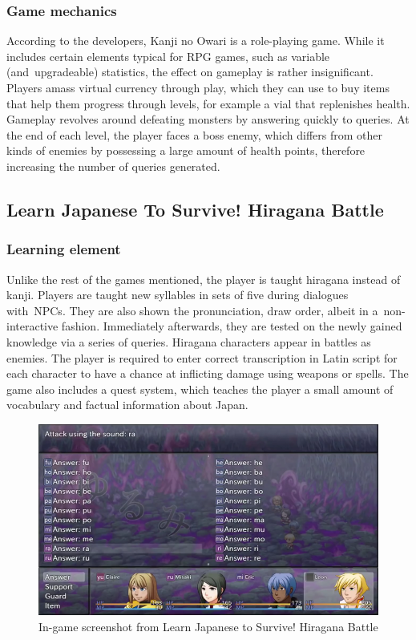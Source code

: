 \documentclass[thesis=B,english,hidelinks]{FITthesisXE}[2012/06/26]
\begin{document}
\subsubsection{Game mechanics}

According to the developers, Kanji no Owari is a role-playing game. While it includes certain elements typical for RPG games, such as variable (and~upgradeable) statistics, the effect on gameplay is rather insignificant. Players amass virtual currency through play, which they can use to buy items that help them progress through levels, for example a vial that replenishes health. Gameplay revolves around defeating monsters by answering quickly to queries. At the end of each level, the player faces a boss enemy, which differs from other kinds of enemies by possessing a large amount of health points, therefore increasing the number of queries generated.

\subsection{Learn Japanese To Survive! Hiragana Battle}

\subsubsection{Learning element}

Unlike the rest of the games mentioned, the player is taught hiragana instead of kanji. Players are taught new syllables in sets of five during dialogues with~NPCs. They are also shown the pronunciation, draw order, albeit in a~non-interactive fashion. Immediately afterwards, they are tested on the newly gained knowledge via a series of queries. Hiragana characters appear in battles as enemies. The player is required to enter correct transcription in Latin script for each character to have a chance at inflicting damage using weapons or spells. The game also includes a quest system, which teaches the player a small amount of vocabulary and factual information about Japan.

\begin{figure}[ht]
\centering
\includegraphics[scale=0.6]{hirbattle}
\caption{In-game screenshot from Learn Japanese to Survive! Hiragana Battle}
\label{fig:hirbattle}
\end{figure}
\end{document}
